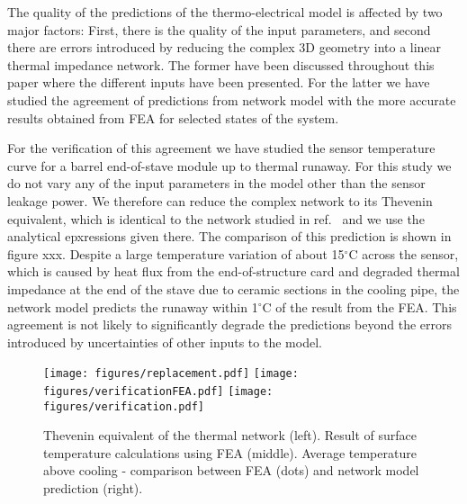 The quality of the predictions of the thermo-electrical model is affected by two major factors: First, there is the quality of the input parameters, and second there are errors introduced by reducing the complex 3D geometry into a linear thermal impedance network. The former have been discussed throughout this paper where the different inputs have been presented. For the latter we have studied the agreement of predictions from network model with the more accurate results obtained from FEA for selected states of the system.

For the verification of this agreement we have studied the sensor temperature curve for a barrel end-of-stave module up to thermal runaway. For this study we do not vary any of the input parameters in the model other than the sensor leakage power. We therefore can reduce the complex network to its Thevenin equivalent, which is identical to the network studied in ref.~\cite{Beck:2010zzd} and we use the analytical epxressions given there. The comparison of this prediction is shown in figure xxx. Despite a large temperature variation of about 15$^\circ$C across the sensor, which is caused by heat flux from the end-of-structure card and degraded thermal impedance at the end of the stave due to ceramic sections in the cooling pipe, the network model predicts the runaway within 1$^\circ$C of the result from the FEA. This agreement is not likely to significantly degrade the predictions beyond the errors introduced by uncertainties of other inputs to the model. 

\begin{figure}[ht]
\centering
\texttt{[image: figures/replacement.pdf]}\quad\quad
\texttt{[image: figures/verificationFEA.pdf]}\quad\quad
\texttt{[image: figures/verification.pdf]}
\caption{Thevenin equivalent of the thermal network (left). Result of surface temperature calculations using FEA (middle). Average temperature above cooling - comparison between FEA (dots) and network model prediction (right).}
\label{fig:modulerampperformance}
\end{figure}

